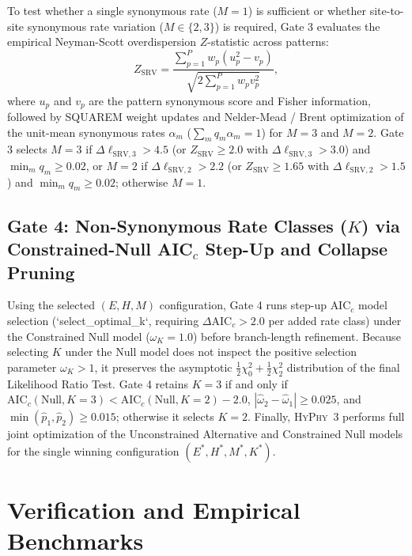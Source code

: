 \documentclass[11pt]{article}
\begin{document}
To test whether a single synonymous rate ($M=1$) is sufficient or whether site-to-site synonymous rate variation ($M \in \{2, 3\}$) is required, Gate 3 evaluates the empirical Neyman-Scott overdispersion $Z$-statistic across patterns:
\begin{equation}
    Z_{\text{SRV}} = \frac{\sum_{p=1}^P w_p (u_p^2 - v_p)}{\sqrt{2 \sum_{p=1}^P w_p v_p^2}},
\end{equation}
where $u_p$ and $v_p$ are the pattern synonymous score and Fisher information, followed by SQUAREM weight updates and Nelder-Mead / Brent optimization of the unit-mean synonymous rates $\alpha_m$ ($\sum_m q_m \alpha_m = 1$) for $M=3$ and $M=2$. Gate 3 selects $M=3$ if $\Delta \ell_{\text{SRV},3} > 4.5$ (or $Z_{\text{SRV}} \ge 2.0$ with $\Delta \ell_{\text{SRV},3} > 3.0$) and $\min_m q_m \ge 0.02$, or $M=2$ if $\Delta \ell_{\text{SRV},2} > 2.2$ (or $Z_{\text{SRV}} \ge 1.65$ with $\Delta \ell_{\text{SRV},2} > 1.5$) and $\min_m q_m \ge 0.02$; otherwise $M=1$.

\subsection{Gate 4: Non-Synonymous Rate Classes ($K$) via Constrained-Null AIC$_c$ Step-Up and Collapse Pruning}

Using the selected $(E, H, M)$ configuration, Gate 4 runs step-up $\text{AIC}_c$ model selection (`select\_optimal\_k`, requiring $\Delta \text{AIC}_c > 2.0$ per added rate class) under the Constrained Null model ($\omega_K = 1.0$) before branch-length refinement. Because selecting $K$ under the Null model does not inspect the positive selection parameter $\omega_K > 1$, it preserves the asymptotic $\frac{1}{2}\chi^2_0 + \frac{1}{2}\chi^2_2$ distribution of the final Likelihood Ratio Test. Gate 4 retains $K=3$ if and only if $\text{AIC}_c(\text{Null}, K=3) < \text{AIC}_c(\text{Null}, K=2) - 2.0$, $|\hat{\omega}_2 - \hat{\omega}_1| \ge 0.025$, and $\min(\hat{p}_1, \hat{p}_2) \ge 0.015$; otherwise it selects $K=2$. Finally, \textsc{HyPhy}~3 performs full joint optimization of the Unconstrained Alternative and Constrained Null models for the single winning configuration $(E^*, H^*, M^*, K^*)$.

\section{Verification and Empirical Benchmarks}
\end{document}
